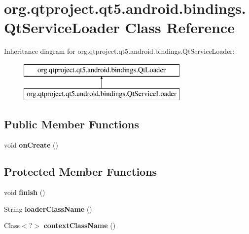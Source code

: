 \hypertarget{classorg_1_1qtproject_1_1qt5_1_1android_1_1bindings_1_1_qt_service_loader}{}\section{org.\+qtproject.\+qt5.\+android.\+bindings.\+Qt\+Service\+Loader Class Reference}
\label{classorg_1_1qtproject_1_1qt5_1_1android_1_1bindings_1_1_qt_service_loader}
Inheritance diagram for org.\+qtproject.\+qt5.\+android.\+bindings.\+Qt\+Service\+Loader\+:\begin{figure}[H]
\begin{center}
\leavevmode
\includegraphics[height=2.000000cm]{classorg_1_1qtproject_1_1qt5_1_1android_1_1bindings_1_1_qt_service_loader}
\end{center}
\end{figure}
\subsection*{Public Member Functions}
\begin{DoxyCompactItemize}
\item 
\mbox{\label{classorg_1_1qtproject_1_1qt5_1_1android_1_1bindings_1_1_qt_service_loader_a5b1efb66d0fc1729101c7657e87ba095}} 
void {\bfseries on\+Create} ()
\end{DoxyCompactItemize}
\subsection*{Protected Member Functions}
\begin{DoxyCompactItemize}
\item 
\mbox{\label{classorg_1_1qtproject_1_1qt5_1_1android_1_1bindings_1_1_qt_service_loader_ac6340827beaecdd36bc4962775321977}} 
void {\bfseries finish} ()
\item 
\mbox{\label{classorg_1_1qtproject_1_1qt5_1_1android_1_1bindings_1_1_qt_service_loader_adfa4391ee3edbc63afa70b63cea9f996}} 
String {\bfseries loader\+Class\+Name} ()
\item 
\mbox{\label{classorg_1_1qtproject_1_1qt5_1_1android_1_1bindings_1_1_qt_service_loader_ace5e02a2642867ea165118b9693b870c}} 
Class$<$?$>$ {\bfseries context\+Class\+Name} ()
\end{DoxyCompactItemize}
